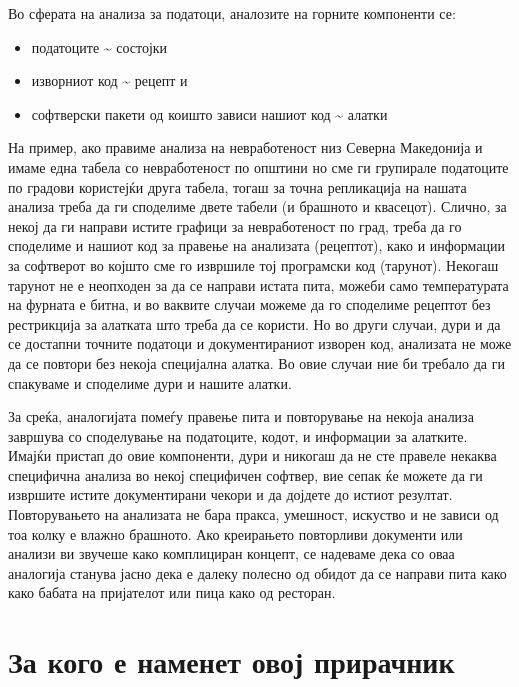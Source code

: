 \documentclass[
]{book}
\providecommand{\tightlist}{%
  \setlength{\itemsep}{0pt}\setlength{\parskip}{0pt}}
\begin{document}
Во сферата на анализа за податоци, аналозите на горните компоненти се:

\begin{itemize}
\tightlist
\item
  податоците \textasciitilde{} состојки\\
\item
  изворниот код \textasciitilde{} рецепт и\\
\item
  софтверски пакети од коишто зависи нашиот код \textasciitilde{} алатки
\end{itemize}

На пример, ако правиме анализа на невработеност низ Северна Македонија и имаме една табела со невработеност по општини но сме ги групирале податоците по градови користејќи друга табела, тогаш за точна репликација на нашата анализа треба да ги споделиме двете табели (и брашното и квасецот). Слично, за некој да ги направи истите графици за невработеност по град, треба да го споделиме и нашиот код за правење на анализата (рецептот), како и информации за софтверот во којшто сме го извршиле тој програмски код (тарунот). Некогаш тарунот не е неопходен за да се направи истата пита, можеби само температурата на фурната е битна, и во ваквите случаи можеме да го споделиме рецептот без рестрикција за алатката што треба да се користи. Но во други случаи, дури и да се достапни точните податоци и документираниот изворен код, анализата не може да се повтори без некоја специјална алатка. Во овие случаи ние би требало да ги спакуваме и споделиме дури и нашите алатки.

За среќа, аналогијата помеѓу правење пита и повторување на некоја анализа завршува со споделување на податоците, кодот, и информации за алатките. Имајќи пристап до овие компоненти, дури и никогаш да не сте правеле некаква специфична анализа во некој специфичен софтвер, вие сепак ќе можете да ги извршите истите документирани чекори и да дојдете до истиот резултат. Повторувањето на анализата не бара пракса, умешност, искуство и не зависи од тоа колку е влажно брашното. Ако креирањето повторливи документи или анализи ви звучеше како комплициран концепт, се надеваме дека со оваа аналогија станува јасно дека е далеку полесно од обидот да се направи пита како како бабата на пријателот или пица како од ресторан.

\hypertarget{audience}{%
\section{За кого е наменет овој прирачник}\label{audience}}
\end{document}
